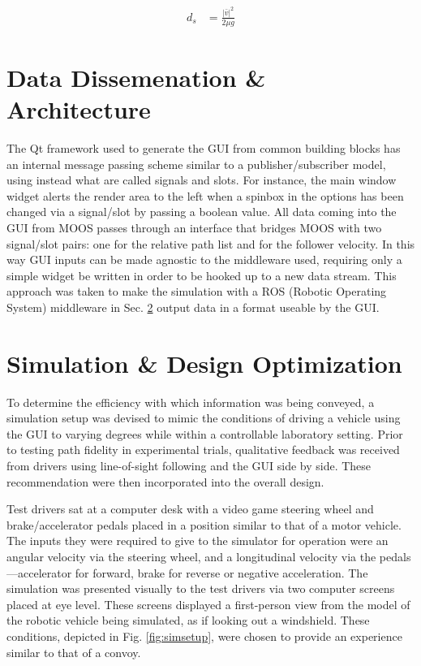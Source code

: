 \documentclass[12pt]{report}
\begin{document}
\begin{align} \label{eq:stopdist}
    d_s &= \frac {|\bar{v}|^2} {2 \mu g}
\end{align}


\section{Data Dissemenation \& Architecture}
\label{sec:datadiss}

The Qt framework used to generate the GUI from common building blocks has an internal message passing scheme similar to a publisher/subscriber model, using instead what are called signals and slots. For instance, the main window widget alerts the render area to the left when a spinbox in the options has been changed via a signal/slot by passing a boolean value. All data coming into the GUI from MOOS passes through an interface that bridges MOOS with two signal/slot pairs: one for the relative path list and for the follower velocity. In this way GUI inputs can be made agnostic to the middleware used, requiring only a simple widget be written in order to be hooked up to a new data stream. This approach was taken to make the simulation with a ROS (Robotic Operating System) middleware in Sec. \ref{sec:simopt} output data in a format useable by the GUI.



\section{Simulation \& Design Optimization}
\label{sec:simopt}

To determine the efficiency with which information was being conveyed, a simulation setup was devised to mimic the conditions of driving a vehicle using the GUI to varying degrees while within a controllable laboratory setting. Prior to testing path fidelity in experimental trials, qualitative feedback was received from drivers using line-of-sight following and the GUI side by side. These recommendation were then incorporated into the overall design.

Test drivers sat at a computer desk with a video game steering wheel and brake/accelerator pedals placed in a position similar to that of a motor vehicle. The inputs they were required to give to the simulator for operation were an angular velocity via the steering wheel, and a longitudinal velocity via the pedals---accelerator for forward, brake for reverse or negative acceleration. The simulation was presented visually to the test drivers via two computer screens placed at eye level. These screens displayed a first-person view from the model of the robotic vehicle being simulated, as if looking out a windshield. These conditions, depicted in Fig. \ref{fig:simsetup}, were chosen to provide an experience similar to that of a convoy. 
\end{document}
